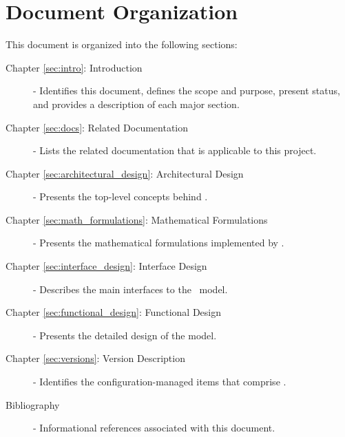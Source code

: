 \section{Document Organization}
This document is organized into the following sections:

\begin{description}

\item[Chapter \ref{sec:intro}: Introduction] -
Identifies this document, defines the scope and purpose, present status,
and provides a description of each major section.

\item[Chapter \ref{sec:docs}: Related Documentation] -
Lists the related documentation that is applicable to this project.

\item[Chapter \ref{sec:architectural_design}: Architectural Design] -
Presents the top-level concepts behind \TrickHLA.

\item[Chapter \ref{sec:math_formulations}: Mathematical Formulations] -
Presents the mathematical formulations implemented by \TrickHLA.

\item[Chapter \ref{sec:interface_design}: Interface Design] -
Describes the main interfaces to the \TrickHLA\ model.

\item[Chapter \ref{sec:functional_design}: Functional Design] -
Presents the detailed design of the model.

\item[Chapter \ref{sec:versions}: Version Description] -
Identifies the configuration-managed items that comprise \TrickHLA.

\item[Bibliography] -
Informational references associated with this document.

\end{description}

